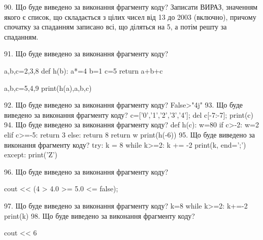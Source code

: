 \documentclass[11pt]{article}
\begin{document}
90. Що буде виведено за виконання фрагменту коду?
Записати ВИРАЗ, значенням якого є список, що складається з цілих чисел від 13 до 2003 (включно), причому спочатку за спаданням записано всі, що діляться на 5, а потім решту за спаданням.

91. Що буде виведено за виконання фрагменту коду?

a,b,c=2,3,8
def h(b):
    a*=4
    b=1
    c=5
    return a+b+c

a,b,c=5,4,9
print(h(a),a,b,c)

92. Що буде виведено за виконання фрагменту коду?
False>"4j"
93. Що буде виведено за виконання фрагменту коду?
c=['0','1','2','3','4']; del c[-7:-7]; print(c)
94. Що буде виведено за виконання фрагменту коду?
def h(c):
      w=80
      if c>-2: w=2
      elif c>=-5: return 3
      else: return 8
      return w
   print(h(-6))
95. Що буде виведено за виконання фрагменту коду?
try:
    k = 8
    while k>=2:
        k += -2
    print(k, end=';')
except:
    print('Z')

96. Що буде виведено за виконання фрагменту коду?

cout << (4 > 4.0 >= 5.0 <= false);

97. Що буде виведено за виконання фрагменту коду?
k=8
   while k>=2: k+=-2
   print(k)
98. Що буде виведено за виконання фрагменту коду?

cout << 6 %
\end{document}
